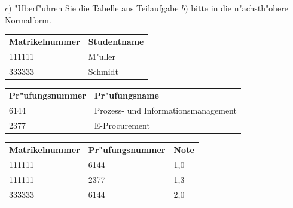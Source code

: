 \noindent
$c)$ "Uberf"uhren Sie die Tabelle aus Teilaufgabe $b)$ bitte in die n"achsth"ohere Normalform.\\


\begin{tabular}{ l l }
    \hline
    \rowcolor{LightSlateGrey}
    \textbf{Matrikelnummer} & \textbf{Studentname} \\
    111111                  & M"uller\\
    333333                  & Schmidt\\
\end{tabular}

\vspace{1cm}

\begin{tabular}{ l l }
    \hline
    \rowcolor{LightSlateGrey}
    \textbf{Pr"ufungsnummer}    & \textbf{Pr"ufungsname}\\
    6144                        & Prozess- und Informationsmanagement\\
    2377                        & E-Procurement\\
\end{tabular}

\vspace{1cm}

\begin{tabular}{ l l l }
    \hline
    \rowcolor{LightSlateGrey}
    \textbf{Matrikelnummer} & \textbf{Pr"ufungsnummer}  & \textbf{Note}\\
    111111                  & 6144                      & 1,0\\
    111111                  & 2377                      & 1,3\\
    333333                  & 6144                      & 2,0\\
\end{tabular}


